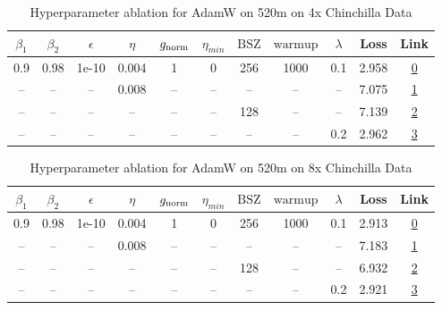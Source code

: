 \begin{table}[H]
\centering
\caption{Hyperparameter ablation for AdamW on 520m on 4x Chinchilla Data}
\label{tab:ablation_adamw_520m_on_4x_chinchilla_data}
\begin{tabular}{ccccccccccc}
\toprule
$\beta_1$ & $\beta_2$ & $\epsilon$ & $\eta$ & $g_{\mathrm{norm}}$ & $\eta_{min}$ & $\mathrm{BSZ}$ & $\mathrm{warmup}$ & $\lambda$ & Loss & Link \\
\midrule
0.9 & 0.98 & 1e-10 & 0.004 & 1 & 0 & 256 & 1000 & 0.1 & 2.958 & \href{https://wandb.ai/marin-community/optimizer-scaling/runs/sweep-520m-42B-adamwbc2b89lr0.004-wd0.1-minlr0-warmup1000-b10.9--50dbd9}{0} \\
\midrule
-- & -- & -- & 0.008 & -- & -- & -- & -- & -- & 7.075 & \href{https://wandb.ai/marin-community/optimizer-scaling/runs/sweep-520m-42B-adamwf6bfb1lr0.008-wd0.1-minlr0-warmup1000-b10.9--c0b516}{1} \\
-- & -- & -- & -- & -- & -- & 128 & -- & -- & 7.139 & \href{https://wandb.ai/marin-community/optimizer-scaling/runs/sweep-520m-42B-adamwf14f39lr0.004-wd0.1-minlr0-warmup1000-b10.9--48b1c7}{2} \\
-- & -- & -- & -- & -- & -- & -- & -- & 0.2 & 2.962 & \href{https://wandb.ai/marin-community/optimizer-scaling/runs/sweep-520m-42B-adamwffc6bdlr0.004-wd0.2-minlr0-warmup1000-b10.9--69bc03}{3} \\
\bottomrule
\end{tabular}
\end{table}

\begin{table}[H]
\centering
\caption{Hyperparameter ablation for AdamW on 520m on 8x Chinchilla Data}
\label{tab:ablation_adamw_520m_on_8x_chinchilla_data}
\begin{tabular}{ccccccccccc}
\toprule
$\beta_1$ & $\beta_2$ & $\epsilon$ & $\eta$ & $g_{\mathrm{norm}}$ & $\eta_{min}$ & $\mathrm{BSZ}$ & $\mathrm{warmup}$ & $\lambda$ & Loss & Link \\
\midrule
0.9 & 0.98 & 1e-10 & 0.004 & 1 & 0 & 256 & 1000 & 0.1 & 2.913 & \href{https://wandb.ai/marin-community/optimizer-scaling/runs/sweep-520m-85B-adamwf14f39lr0.004-wd0.1-minlr0-warmup1000-b10.9--84afa9}{0} \\
\midrule
-- & -- & -- & 0.008 & -- & -- & -- & -- & -- & 7.183 & \href{https://wandb.ai/marin-community/optimizer-scaling/runs/sweep-520m-85B-adamw166f50lr0.008-wd0.1-minlr0-warmup1000-b10.9--397bf5}{1} \\
-- & -- & -- & -- & -- & -- & 128 & -- & -- & 6.932 & \href{https://wandb.ai/marin-community/optimizer-scaling/runs/sweep-520m-85B-adamw2b7ec2lr0.004-wd0.1-minlr0-warmup1000-b10.9--01c1ad}{2} \\
-- & -- & -- & -- & -- & -- & -- & -- & 0.2 & 2.921 & \href{https://wandb.ai/marin-community/optimizer-scaling/runs/sweep-520m-85B-adamw61633blr0.004-wd0.2-minlr0-warmup1000-b10.9--1a26e3}{3} \\
\bottomrule
\end{tabular}
\end{table}

